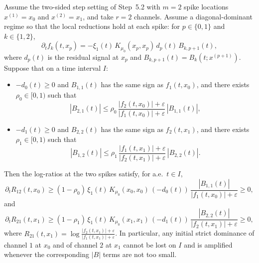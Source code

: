 \begin{lemma}\label{lem:r2-twospike-step}
Assume the two-sided step setting of Step~5.2 with $m=2$ spike locations $x^{(1)}=x_0$ and $x^{(2)}=x_1$, and take $r=2$ channels.
Assume a diagonal-dominant regime so that the local reductions hold at each spike:
for $p\in\{0,1\}$ and $k\in\{1,2\}$,
\[
\partial_t f_k(t,x_p)=-\xi_1(t)\,K_{\mu_0}(x_p,x_p)\,d_p(t)\,B_{k,p+1}(t),
\]
where $d_p(t)$ is the residual signal at $x_p$ and $B_{k,p+1}(t)=B_k(t;x^{(p+1)})$.
Suppose that on a time interval $I$:
\begin{itemize}
\item $-d_0(t)\ge 0$ and $B_{1,1}(t)$ has the same sign as $f_1(t,x_0)$, and there exists $\rho_0\in[0,1)$ such that
\[
|B_{2,1}(t)|\le \rho_0\,\frac{|f_2(t,x_0)|+\varepsilon}{|f_1(t,x_0)|+\varepsilon}\,|B_{1,1}(t)|,
\]
\item $-d_1(t)\ge 0$ and $B_{2,2}(t)$ has the same sign as $f_2(t,x_1)$, and there exists $\rho_1\in[0,1)$ such that
\[
|B_{1,2}(t)|\le \rho_1\,\frac{|f_1(t,x_1)|+\varepsilon}{|f_2(t,x_1)|+\varepsilon}\,|B_{2,2}(t)|.
\]
\end{itemize}
Then the log-ratios at the two spikes satisfy, for a.e.\ $t\in I$,
\[
\partial_t R_{12}(t,x_0)\ge (1-\rho_0)\,\xi_1(t)\,K_{\mu_0}(x_0,x_0)\,(-d_0(t))\,\frac{|B_{1,1}(t)|}{|f_1(t,x_0)|+\varepsilon}\ge 0,
\]
and
\[
\partial_t R_{21}(t,x_1)\ge (1-\rho_1)\,\xi_1(t)\,K_{\mu_0}(x_1,x_1)\,(-d_1(t))\,\frac{|B_{2,2}(t)|}{|f_2(t,x_1)|+\varepsilon}\ge 0,
\]
where $R_{21}(t,x_1)=\log\frac{|f_2(t,x_1)|+\varepsilon}{|f_1(t,x_1)|+\varepsilon}$.
In particular, any initial strict dominance of channel $1$ at $x_0$ and of channel $2$ at $x_1$ cannot be lost on $I$ and is amplified whenever the corresponding $|B|$ terms are not too small.
\end{lemma}

